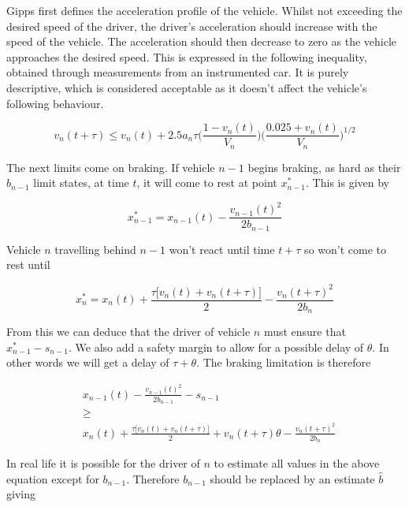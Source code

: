 Gipps first defines the acceleration profile of the vehicle. Whilst not exceeding the desired speed of the driver, the driver's acceleration should increase with the speed of the vehicle. The acceleration should then decrease to zero as the vehicle approaches the desired speed. This is expressed in the following inequality, obtained through measurements from an instrumented car. It is purely descriptive, which is considered acceptable as it doesn't affect the vehicle's following behaviour.

\begin{equation*}
v_n(t+\tau) \leqslant v_n(t) + 2.5a_n\tau\Biggl(\frac{1 - v_n(t)}{V_n}\Biggr)\Biggl(\frac{0.025 + v_n(t)}{V_n}\Biggr)^{1/2}
\end{equation*}

The next limits come on braking. If vehicle $n - 1$ begins braking, as hard as their $b_{n-1}$ limit states, at time $t$, it will come to rest at point $x_{n-1}^*$. This is given by

\begin{equation*}
x_{n-1}^* = x_{n-1}(t) - \frac{v_{n-1}(t)^2}{2b_{n-1}}
\end{equation*}

Vehicle $n$ travelling behind $n-1$ won't react until time $t + \tau$ so won't come to rest until

\begin{equation*}
x_n^* = x_n(t) + \frac{\tau\bigl[v_n(t) + v_n(t + \tau)\bigr]}{2} - \frac{v_n(t + \tau)^2}{2b_n}
\end{equation*}

From this we can deduce that the driver of vehicle $n$ must ensure that $x_{n-1}^* - s_{n-1}$. We also add a safety margin to allow for a possible delay of $\theta$. In other words we will get a delay of $\tau + \theta$. The braking limitation is therefore

\begin{equation*}
\begin{split}
&x_{n-1}(t) - \frac{v_{n-1}(t)^2}{2b_{n-1}} - s_{n-1}\\
& \geqslant\\
& x_n(t) + \frac{\tau\bigl[v_n(t) + v_n(t + \tau)\bigr]}{2} + v_n(t + \tau)\theta - \frac{v_n(t + \tau)^2}{2b_n}
\end{split}
\end{equation*}

In real life it is possible for the driver of $n$ to estimate all values in the above equation except for $b_{n-1}$. Therefore $b_{n-1}$ should be replaced by an estimate $\hat{b}$ giving


